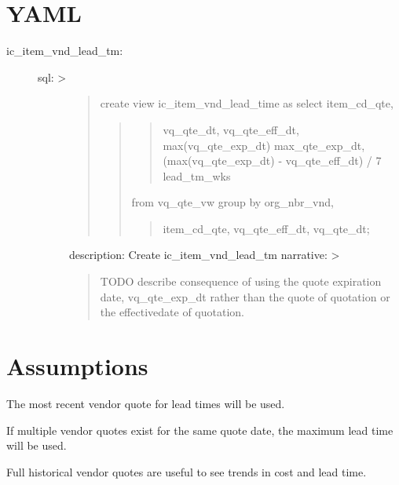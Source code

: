 \documentclass[letterpaper,10pt,english]{sphinxmanual}
\begin{document}
\section{YAML}
\label{Portal/450-MultipleLeadTimes2:yaml}\begin{description}
\item[{ic\_item\_vnd\_lead\_tm:}] \leavevmode\begin{description}
\item[{sql: \textgreater{}}] \leavevmode\begin{quote}

create view ic\_item\_vnd\_lead\_time as
select item\_cd\_qte,
\begin{quote}
\begin{quote}

vq\_qte\_dt,
vq\_qte\_eff\_dt,
max(vq\_qte\_exp\_dt) max\_qte\_exp\_dt,
(max(vq\_qte\_exp\_dt) - vq\_qte\_eff\_dt) / 7 lead\_tm\_wks
\end{quote}

from vq\_qte\_vw
group by org\_nbr\_vnd,
\begin{quote}

item\_cd\_qte,
vq\_qte\_eff\_dt,
vq\_qte\_dt;
\end{quote}
\end{quote}
\end{quote}

description: Create ic\_item\_vnd\_lead\_tm
narrative: \textgreater{}
\begin{quote}

TODO describe consequence of using the quote expiration date, vq\_qte\_exp\_dt
rather than the quote of quotation or the effectivedate of quotation.
\end{quote}

\end{description}

\end{description}


\section{Assumptions}
\label{Portal/450-MultipleLeadTimes2:assumptions}
The most recent vendor quote for lead times will be used.

If multiple vendor quotes exist for the same quote date, the maximum
lead time will be used.

Full historical vendor quotes are useful to see trends in cost and lead
time.
\end{document}
